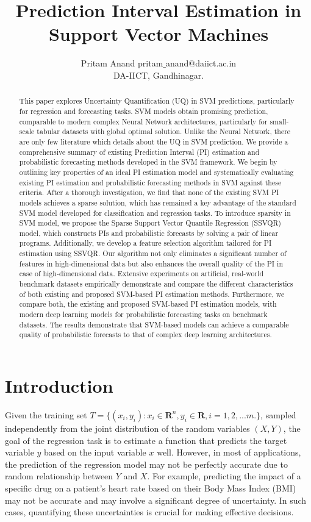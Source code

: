 \documentclass[10pt]{article} %
\title{Prediction Interval Estimation in Support Vector Machines}
\author{\name Pritam Anand \email pritam$\_$anand@daiict.ac.in \\
      \addr DA-IICT, Gandhinagar.
     }
\begin{document}
\maketitle

\begin{abstract}
This paper explores Uncertainty Quantification (UQ) in SVM predictions, particularly for regression and forecasting tasks. SVM models obtain promising prediction, comparable to modern complex Neural Network architectures, particularly for small-scale tabular datasets with global optimal solution. Unlike the Neural Network, there are  only few literature which details about the UQ in SVM prediction.  We provide a comprehensive summary of existing Prediction Interval (PI) estimation and probabilistic forecasting methods developed in the SVM framework. We begin by outlining key properties of an ideal PI estimation model and systematically evaluating existing PI estimation and probabilistic forecasting methods in SVM against these criteria. After a thorough investigation, we find that none of the existing SVM PI models achieves a sparse solution, which has remained a key advantage of the standard SVM model developed for classification and regression tasks. To introduce sparsity in SVM model, we propose the Sparse Support Vector Quantile Regression (SSVQR) model, which constructs PIs and probabilistic forecasts by solving a pair of linear programs. Additionally, we develop a feature selection algorithm tailored for PI estimation using SSVQR. Our algorithm not only eliminates a significant number of features in high-dimensional data but also enhances the overall quality of the PI in case of high-dimensional data. Extensive experiments on artificial, real-world benchmark datasets empirically demonstrate and compare the different characteristics of both existing and proposed SVM-based PI estimation methods. Furthermore, we compare both, the existing and proposed SVM-based  PI estimation models, with modern deep learning models for probabilistic forecasting tasks on benchmark datasets. The results demonstrate that SVM-based models can achieve a comparable quality of probabilistic forecasts to that of complex deep learning architectures. 
\end{abstract}

\section{Introduction}
\label{sec:sample1}
Given the training set $T=\{(x_i,y_i): x_i \in \mathbf{R}^n, y_i \in \mathbf{R}, i =1,2,...m. \}$, sampled independently from the joint distribution of the random variables $(X,Y)$, the goal of the regression task is to estimate a function that predicts the target variable  $y$ based on the input variable $x$ well. However, in most of applications, the prediction of the regression model may not be perfectly accurate due to random relationship between $Y$ and $X$. For example, predicting the impact of a specific drug on a patient's heart rate based on their Body Mass Index (BMI) may  not be accurate and  may involve a significant degree of uncertainty. In such cases, quantifying these uncertainties is crucial for making effective decisions.
\end{document}
